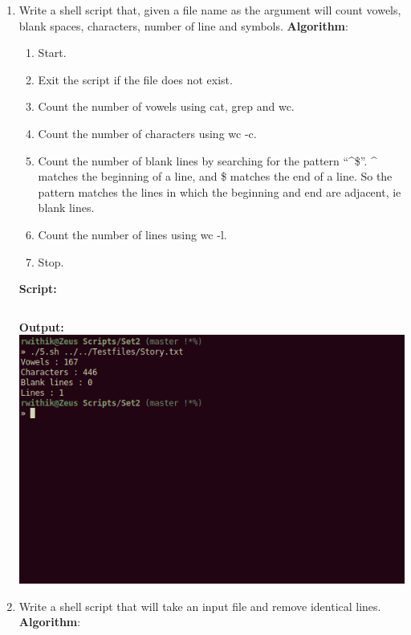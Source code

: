 \documentclass[10pt,a4paper,titlepage]{report}
\begin{document}
\begin{enumerate}
\item Write a shell script that, given a file name as the argument will count vowels, blank spaces, characters, number of line and symbols. \newline
\textbf{Algorithm}:\newline
\begin{enumerate}
	\item Start.
	\item Exit the script if the file does not exist.
	\item Count the number of vowels using {\color{red}cat}, {\color{red}grep} and {\color{red}wc}.
	\item Count the number of characters using {\color{red}wc -c}.
	\item Count the number of blank lines by searching for the pattern ``\^{}\$''. \^{} matches the beginning of a line, and \$ matches the end of a line. So the pattern matches the lines in which the beginning and end are adjacent, ie blank lines.
	\item Count the number of lines using {\color{red}wc -l}.
	\item Stop.
\end{enumerate}
\newline
\textbf{Script:}\newline
\inputminted{bash}{../Scripts/Set2/5.sh}
\newline
\textbf{Output:}\newline
\includegraphics[width=\linewidth]{../Images/Shell2/5.png}
\pagebreak
\item Write a shell script that will take an input file and remove identical lines. \newline
\textbf{Algorithm}:\newline

\end{enumerate}
\end{document}
